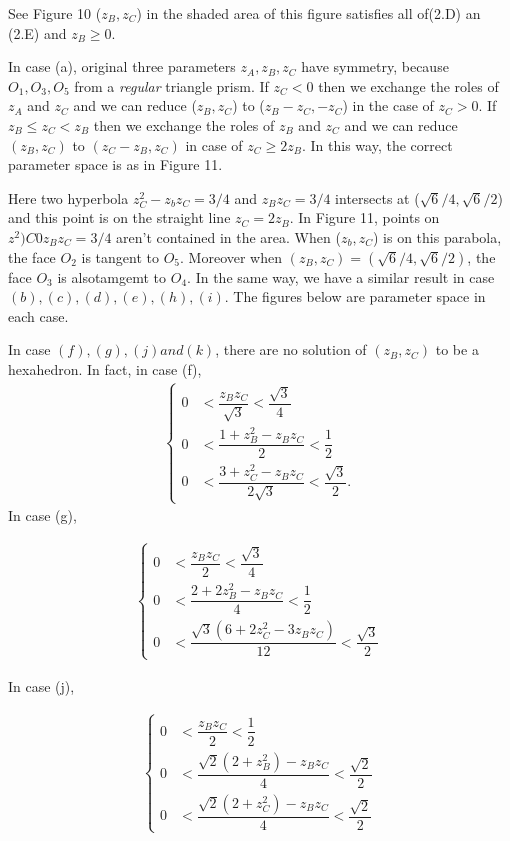 \documentclass[dvipdfmx]{interact}
\theoremstyle{plain}%
\theoremstyle{definition}
\theoremstyle{remark}
\theoremstyle{problemstyle}
\begin{document}
See Figure 10 ($z_B, z_C$) in the shaded area of this figure satisfies
all of(2.D) an (2.E) and $z_B \geq 0$.

In case (a), original three parameters $z_A, z_B, z_C$ have symmetry,
because $O_1, O_3, O_5$ from a \textit{regular} triangle prism.
If $z_C < 0$ then we exchange the roles of $z_A$ and $z_C$ and we can reduce
($z_B, z_C$) to ($z_B - z_C, -z_C$) in the case of $z_C > 0$.
If $z_B \leq z_C < z_B$ then we exchange the roles of $z_B$ and $z_C$
and we can reduce $(z_B, z_C)$ to $(z_C -z_B,z_C)$ in case of 
$z_C \geq 2z_B$. In this way, the correct parameter space is as in Figure
11.

Here two hyperbola $z^2_C - z_bz_C = 3/4$ and $z_B z_C = 3/4$ intersects
at ($\sqrt{6} / 4, \sqrt{6}/2$) and this point is on the straight line
$z_C=2z_B$. In Figure 11, points on $z^2)C 0 z_Bz_C = 3/4$ aren't
contained in the area. When ($z_b, z_C$) is on this parabola, the face
$O_2$ is tangent to $O_5$. Moreover when
$(z_B, z_C) = (\sqrt{6} / 4, \sqrt{6}/2)$, the face $O_3$ is alsotamgemt
to $O_4$.
In the same way, we have a similar result in case $(b), (c), (d), (e),
(h), (i)$. The figures below are parameter space in each case.

In case $(f), (g), (j) and (k)$, there are no solution of $(z_B, z_C)$
to be a hexahedron. In fact, in case (f),
\begin{align*}
\begin{cases}
 0 &< \dfrac{z_Bz_C}{\sqrt{3}} < \dfrac{\sqrt{3}}{4} \\
 0 &< \dfrac{1 + z^2_B - z_Bz_C}{2} < \dfrac{1}{2} \\
 0 &< \dfrac{3 + z^2_C - z_Bz_C}{2\sqrt{3}} < \dfrac{\sqrt{3}}{2}.
\end{cases}
\end{align*}
In case (g),

\begin{align*}
\begin{cases}
0 &< \dfrac{z_Bz_C}{2} < \dfrac{\sqrt{3}}{4} \\
0 &< \dfrac{2 + 2z^2_B - z_Bz_C}{4} < \dfrac{1}{2} \\
0 &< \dfrac{\sqrt{3}(6 + 2z^2_C - 3z_Bz_C)}{12} < \dfrac{\sqrt{3}}{2}
\end{cases}
\end{align*}

In case (j),

\begin{align*}
 \begin{cases}
  0 &< \dfrac{z_Bz_C}{2} < \dfrac{1}{2}\\
  0 &< \dfrac{\sqrt{2}(2 + z^2_B) - z_B z_C}{4} < \dfrac{\sqrt{2}}{2}\\
  0 &< \dfrac{\sqrt{2}(2 + z^2_C) - z_B z_C}{4} < \dfrac{\sqrt{2}}{2}
 \end{cases}
\end{align*}
\end{document}
